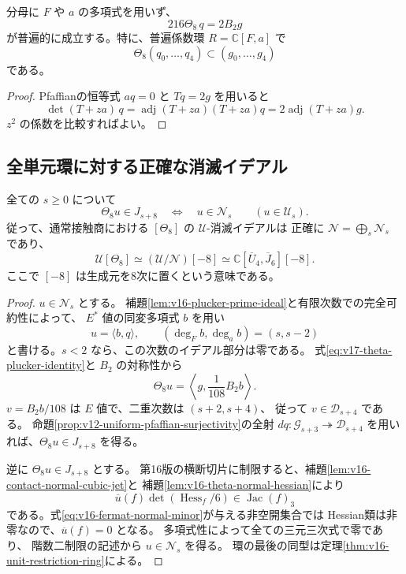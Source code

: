 \begin{proposition}
\label{prop:v17-theta-plucker-identity}
分母に $F$ や $a$ の多項式を用いず、
\begin{equation}\label{eq:v17-theta-plucker-identity}
 216\Theta_8\,q=2B_2g
\end{equation}
が普遍的に成立する。特に、普遍係数環 $R=\mathbb C[F,a]$ で
\[
 \Theta_8(q_0,\ldots,q_4)\subset(g_0,\ldots,g_4)
\]
である。
\end{proposition}

\begin{proof}
Pfaffianの恒等式 $aq=0$ と $Tq=2g$ を用いると
\[
 \det(T+za)\,q
 =\operatorname{adj}(T+za)(T+za)q
 =2\operatorname{adj}(T+za)g.
\]
$z^2$ の係数を比較すればよい。
\end{proof}

\subsection{全単元環に対する正確な消滅イデアル}

\begin{theorem}
\label{thm:v17-theta-unit-annihilator}
全ての $s\ge0$ について
\begin{equation}\label{eq:v17-theta-unit-annihilator}
 \Theta_8u\in J_{s+8}
 \quad\Longleftrightarrow\quad
 u\in\mathcal N_s
 \qquad(u\in\mathcal U_s).
\end{equation}
従って、通常接触商における $[\Theta_8]$ の $\mathcal U$-消滅イデアルは
正確に $\mathcal N=\bigoplus_s\mathcal N_s$ であり、
\[
 \mathcal U[\Theta_8]\simeq(\mathcal U/\mathcal N)[-8]
 \simeq\mathbb C[\overline U_4,\overline J_6][-8].
\]
ここで $[-8]$ は生成元を8次に置くという意味である。
\end{theorem}

\begin{proof}
$u\in\mathcal N_s$ とする。
補題\ref{lem:v16-plucker-prime-ideal}と有限次数での完全可約性によって、
$E^*$ 値の同変多項式 $b$ を用い
\[
 u=\langle b,q\rangle,\qquad
 (\deg_Fb,\deg_ab)=(s,s-2)
\]
と書ける。$s<2$ なら、この次数のイデアル部分は零である。
式\eqref{eq:v17-theta-plucker-identity}と $B_2$ の対称性から
\[
 \Theta_8u=\left\langle g,\frac1{108}B_2b\right\rangle.
\]
$v=B_2b/108$ は $E$ 値で、二重次数は $(s+2,s+4)$、
従って $v\in\mathcal D_{s+4}$ である。
命題\ref{prop:v12-uniform-pfaffian-surjectivity}の全射
$dq:\mathcal G_{s+3}\twoheadrightarrow\mathcal D_{s+4}$
を用いれば、$\Theta_8u\in J_{s+8}$ を得る。

逆に $\Theta_8u\in J_{s+8}$ とする。
第16版の横断切片に制限すると、補題\ref{lem:v16-contact-normal-cubic-jet}と
補題\ref{lem:v16-theta-normal-hessian}により
\[
 \overline u(f)\det(\operatorname{Hess}_f/6)
 \in\operatorname{Jac}(f)_3
\]
である。式\eqref{eq:v16-fermat-normal-minor}が与える非空開集合では
Hessian類は非零なので、$\overline u(f)=0$ となる。
多項式性によって全ての三元三次式で零であり、
階数二制限の記述から $u\in\mathcal N_s$ を得る。
環の最後の同型は定理\ref{thm:v16-unit-restriction-ring}による。
\end{proof}

